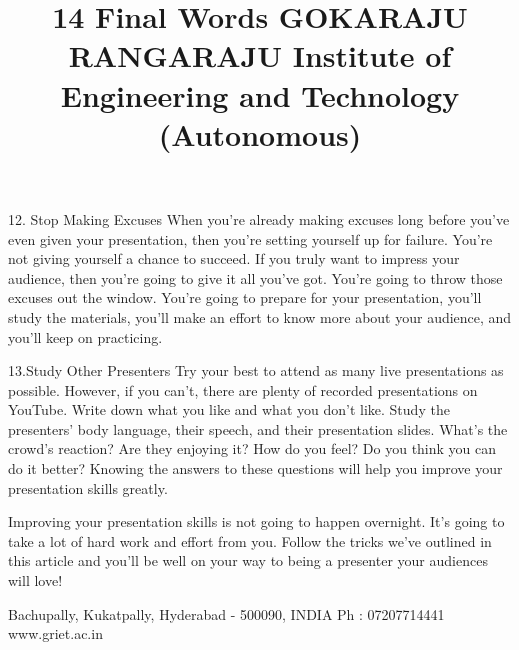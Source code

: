 12. Stop Making Excuses
When you're already making excuses long before you've even given your presentation, then you're setting yourself up for failure. You're not giving yourself a chance to succeed. If you truly want to impress your audience, then you're going to give it all you've got. You're going to throw those excuses out the window. You're going to prepare for your presentation, you'll study the materials, you'll make an effort to know more about your audience, and you'll keep on practicing.

13.Study Other Presenters
Try your best to attend as many live presentations as possible. However, if you can't, there are plenty of recorded presentations on YouTube. Write down what you like and what you don't like. Study the presenters' body language, their speech, and their presentation slides. What's the crowd's reaction? Are they enjoying it? How do you feel? Do you think you can do it better? Knowing the answers to these questions will help you improve your presentation skills greatly.
\title{
14 Final Words
}
Improving your presentation skills is not going to happen overnight. It's going to take a lot of hard work and effort from you. Follow the tricks we've outlined in this article and you'll be well on your way to being a presenter your audiences will love!

\title{
GOKARAJU RANGARAJU Institute of Engineering and Technology (Autonomous)
}
Bachupally, Kukatpally, Hyderabad - 500090, INDIA
Ph : 07207714441 www.griet.ac.in